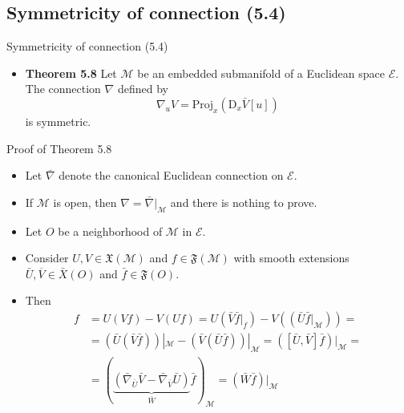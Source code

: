 \documentclass{beamer}
\begin{document}
\subsection{Symmetricity of connection (5.4)}
\begin{frame}{Symmetricity of connection (5.4)}
    \begin{itemize}
        \item \textbf{Theorem 5.8} Let $\mathcal{M}$ be an embedded submanifold of a Euclidean space $\mathcal{E}$. The connection $\nabla$ defined by 
        \begin{equation}
            \nabla_u V = \text{Proj}_x (\text{D}_x\bar{V}[u])
        \end{equation}
        is symmetric. 
    \end{itemize}
\end{frame}

\begin{frame}{Proof of Theorem 5.8}
    \begin{itemize}[<+->]
        \item Let $\bar{\nabla}$ denote the canonical Euclidean connection on $\mathcal{E}$. 
        \item If $\mathcal{M}$ is open, then $\nabla = \bar{\nabla} |_\mathcal{M}$ and there is nothing to prove. 
        \item Let $O$ be a neighborhood of $\mathcal{M}$ in $\mathcal{E}$.
        \item Consider $U, V \in \mathfrak{X}(\mathcal{M})$ and $f \in \mathfrak{F}(\mathcal{M})$ with smooth extensions $\bar{U}, \overline{V} \in \bar{X}(O)$ and $\bar{f} \in \mathfrak{F}(O)$. 
        \item Then 
        \begin{align*}
            [U, V]f &= U(Vf) - V(Uf) = U(\bar{V}\bar{f}|_f) - V((\bar{U} \bar{f} |_\mathcal{M})) = \\
            &= (\bar{U}(\bar{V} \bar{f}))|_\mathcal{M} - (\bar{V}(\bar{U}\bar{f}))|_\mathcal{M} = ([\bar{U}, \bar{V}]\bar{f})|_\mathcal{M} = \\
            &= (\underbrace{(\bar{\nabla}_{\bar{U}} \bar{V} - \bar{\nabla}_{\bar{V} } \bar{U})}_{\bar{W}} \bar{f})_\mathcal{M} = (\bar{W} \bar{f})|_\mathcal{M}
        \end{align*}
    \end{itemize}
\end{frame}
\end{document}
